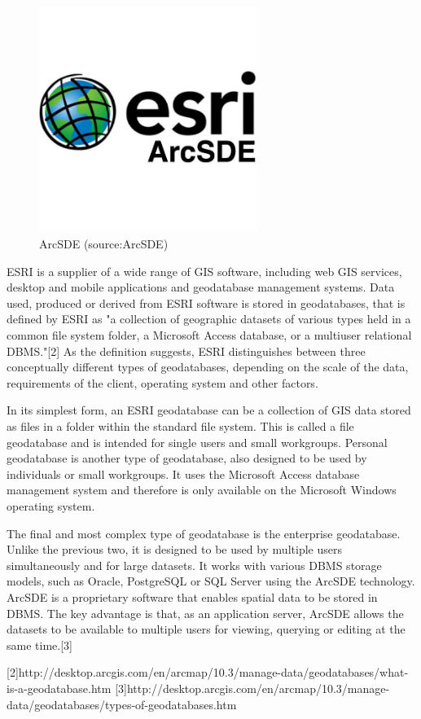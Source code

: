 \begin{itemize}
\begin{figure}[H] \centering
      \includegraphics[width=200pt]{./pictures/arcsde.png}
      \caption[ArcSDE logo]{ArcSDE (source:ArcSDE)}
      \label{fig:ArcSDE}
  \end{figure}
	
ESRI is a supplier of a wide range of GIS software, including web GIS services, desktop and mobile applications and geodatabase management systems. Data used, produced or derived from ESRI software is stored in geodatabases, that is defined by ESRI as "a collection of geographic datasets of various types held in a common file system folder, a Microsoft Access database, or a multiuser relational DBMS."[2] As the definition suggests, ESRI distinguishes between three conceptually different types of geodatabases, depending on the scale of the data, requirements of the client, operating system and other factors.


In its simplest form, an ESRI geodatabase can be a collection of GIS data stored as files in a folder within the standard file system. This is called a file geodatabase and is intended for single users and small workgroups. Personal geodatabase is another type of geodatabase, also designed to be used by individuals or small workgroups. It uses the Microsoft Access database management system and therefore is only available on the Microsoft Windows operating system. 


The final and most complex type of geodatabase is the enterprise geodatabase. Unlike the previous two, it is designed to be used by multiple users simultaneously and for large datasets. It works with various DBMS storage models, such as Oracle, PostgreSQL or SQL Server using the ArcSDE technology. ArcSDE is a proprietary software that enables spatial data to be stored in DBMS. The key advantage is that, as an application server, ArcSDE allows the datasets to be available to multiple users for viewing, querying or editing at the same time.[3]



[2]http://desktop.arcgis.com/en/arcmap/10.3/manage-data/geodatabases/what-is-a-geodatabase.htm
[3]http://desktop.arcgis.com/en/arcmap/10.3/manage-data/geodatabases/types-of-geodatabases.htm
	
	
\end{itemize}


